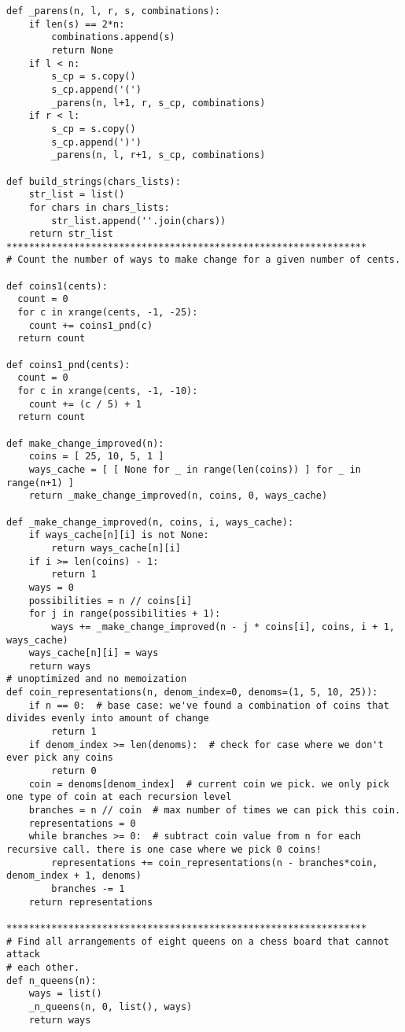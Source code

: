 \documentclass[12pt]{article}
\begin{document}
\begin{lstlisting}
def _parens(n, l, r, s, combinations):
    if len(s) == 2*n:
        combinations.append(s)
        return None
    if l < n:
        s_cp = s.copy()
        s_cp.append('(')
        _parens(n, l+1, r, s_cp, combinations)
    if r < l:
        s_cp = s.copy()
        s_cp.append(')')
        _parens(n, l, r+1, s_cp, combinations)

def build_strings(chars_lists):
    str_list = list()
    for chars in chars_lists:
        str_list.append(''.join(chars))
    return str_list
****************************************************************
# Count the number of ways to make change for a given number of cents.

def coins1(cents):
  count = 0
  for c in xrange(cents, -1, -25):
    count += coins1_pnd(c)
  return count

def coins1_pnd(cents):
  count = 0
  for c in xrange(cents, -1, -10):
    count += (c / 5) + 1
  return count

def make_change_improved(n):
    coins = [ 25, 10, 5, 1 ]
    ways_cache = [ [ None for _ in range(len(coins)) ] for _ in range(n+1) ]
    return _make_change_improved(n, coins, 0, ways_cache)

def _make_change_improved(n, coins, i, ways_cache):
    if ways_cache[n][i] is not None:
        return ways_cache[n][i]
    if i >= len(coins) - 1:
        return 1
    ways = 0
    possibilities = n // coins[i]
    for j in range(possibilities + 1):
        ways += _make_change_improved(n - j * coins[i], coins, i + 1, ways_cache)
    ways_cache[n][i] = ways
    return ways
# unoptimized and no memoization
def coin_representations(n, denom_index=0, denoms=(1, 5, 10, 25)):
    if n == 0:  # base case: we've found a combination of coins that divides evenly into amount of change
        return 1
    if denom_index >= len(denoms):  # check for case where we don't ever pick any coins
        return 0
    coin = denoms[denom_index]  # current coin we pick. we only pick one type of coin at each recursion level
    branches = n // coin  # max number of times we can pick this coin.
    representations = 0
    while branches >= 0:  # subtract coin value from n for each recursive call. there is one case where we pick 0 coins!
        representations += coin_representations(n - branches*coin, denom_index + 1, denoms)
        branches -= 1
    return representations

****************************************************************
# Find all arrangements of eight queens on a chess board that cannot attack
# each other.
def n_queens(n):
    ways = list()
    _n_queens(n, 0, list(), ways)
    return ways


\end{lstlisting}
\end{document}
